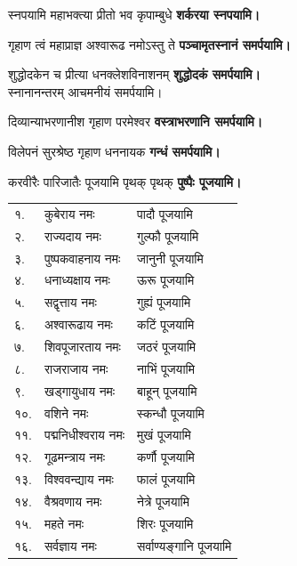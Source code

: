 \begin{center}
{स्नपयामि महाभक्त्या प्रीतो भव कृपाम्बुधे}
\textbf{\devAya{} शर्करया स्नपयामि।}\medskip

{गृहाण त्वं महाप्राज्ञ अश्वारूढ नमोऽस्तु ते}
\textbf{\devAya{} पञ्चामृतस्नानं समर्पयामि।}\medskip

{शुद्धोदकेन च प्रीत्या धनक्लेशविनाशनम्}
\textbf{\devAya{} शुद्धोदकं समर्पयामि।}\\
स्नानानन्तरम् आचमनीयं समर्पयामि।\medskip

{दिव्यान्याभरणानीश गृहाण परमेश्वर}
\textbf{\devAya{} वस्त्राभरणानि समर्पयामि।}\medskip

{विलेपनं सुरश्रेष्ठ गृहाण धननायक}
\textbf{\devAya{} गन्धं समर्पयामि।}\medskip

{करवीरैः पारिजातैः पूजयामि पृथक् पृथक्}
\textbf{\devAya{} पुष्पैः पूजयामि।}
\end{center}

\begin{longtable}{ll@{— }l}
१.& कुबेराय नमः & पादौ पूजयामि\\
२.& राज्यदाय नमः & गुल्फौ पूजयामि\\
३.& पुष्पकवाहनाय नमः & जानुनी पूजयामि\\
४.& धनाध्यक्षाय नमः & ऊरू पूजयामि\\
५.& सद्वृत्ताय नमः & गुह्यं पूजयामि\\
६.& अश्वारूढाय नमः & कटिं पूजयामि\\
७.& शिवपूजारताय नमः & जठरं पूजयामि\\
८.& राजराजाय नमः & नाभिं पूजयामि\\
९.& खड्गायुधाय नमः & बाहून् पूजयामि\\
१०.& वशिने नमः & स्कन्धौ पूजयामि\\
११.& पद्मनिधीश्वराय नमः & मुखं पूजयामि\\
१२.& गूढमन्त्राय नमः & कर्णौ पूजयामि\\
१३.& विश्ववन्द्याय नमः & फालं पूजयामि\\
१४.& वैश्रवणाय नमः & नेत्रे पूजयामि\\
१५.& महते नमः & शिरः पूजयामि\\
१६.& सर्वज्ञाय नमः & सर्वाण्यङ्गानि पूजयामि\\
\end{longtable}

